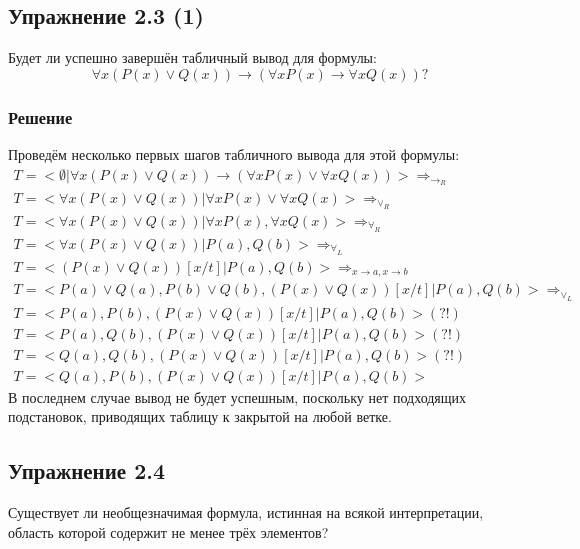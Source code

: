 \documentclass[11pt]{article}
\newcounter{th}\setcounter{th}{0}
\begin{document}
\subsection{Упражнение 2.3 (1)}
\label{sec:org9fa5b3f}
Будет ли успешно завершён табличный вывод для формулы:
\begin{equation*}
\forall x (P(x) \lor Q(x)) \to (\forall x P(x) \to \forall x Q(x))?
\end{equation*}
\subsubsection{Решение}
\label{sec:orgc129b0c}
Проведём несколько первых шагов табличного вывода для этой формулы:
\begin{gather*}
T = <\emptyset | \forall x (P(x) \lor Q(x)) \to (\forall x P(x) \lor \forall x Q(x))> \Rightarrow_{\to_R} \\
T = <\forall x (P(x) \lor Q(x)) | \forall x P(x) \lor \forall x Q(x)> \Rightarrow_{\lor_R} \\
T = <\forall x (P(x) \lor Q(x)) | \forall x P(x), \forall x Q(x)> \Rightarrow_{\forall_R} \\
T = <\forall x (P(x) \lor Q(x)) | P(a), Q(b)> \Rightarrow_{\forall_L} \\
T = <(P(x) \lor Q(x))[x/t] | P(a), Q(b)> \Rightarrow_{x \to a, x \to b} \\
T = <P(a) \lor Q(a), P(b) \lor Q(b), (P(x) \lor Q(x))[x/t] | P(a), Q(b)> \Rightarrow_{\lor_L} \\
T = <P(a), P(b), (P(x) \lor Q(x))[x/t] | P(a), Q(b)> (?!) \\
T = <P(a), Q(b), (P(x) \lor Q(x))[x/t] | P(a), Q(b)> (?!) \\
T = <Q(a), Q(b), (P(x) \lor Q(x))[x/t] | P(a), Q(b)> (?!) \\
T = <Q(a), P(b), (P(x) \lor Q(x))[x/t] | P(a), Q(b)>
\end{gather*}
В последнем случае вывод не будет успешным, поскольку нет подходящих подстановок, приводящих таблицу к закрытой на любой ветке.
\subsection{Упражнение 2.4}
\label{sec:org51c6829}
Существует ли необщезначимая формула, истинная на всякой интерпретации, область которой содержит не менее трёх элементов?
\end{document}
